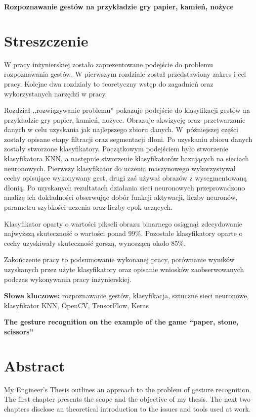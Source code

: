 \newpage
\begin{center}
\large \bf
Rozpoznawanie gestów na przykładzie gry papier, kamień, nożyce
\end{center}

\section*{Streszczenie}
W pracy inżynierskiej zostało zaprezentowane podejście do problemu rozpoznawania gestów. W pierwszym rozdziale został przedstawiony zakres i cel pracy. Kolejne dwa rozdziały to teoretyczny wstęp do zagadnień oraz wykorzystanych narzędzi w pracy. 

Rozdział ,,rozwiązywanie problemu'' pokazuje podejście do klasyfikacji gestów na przykładzie gry papier, kamień, nożyce. Obrazuje akwizycję oraz~przetwarzanie danych w celu uzyskania jak najlepszego zbioru danych. W~późniejszej części zostały opisane etapy filtracji oraz segmentacji dłoni. Po uzyskaniu zbioru danych zostały stworzone klasyfikatory. Początkowym podejściem było stworzenie klasyfikatora KNN, a następnie stworzenie klasyfikatorów bazujących na sieciach neuronowych. Pierwszy klasyfikator do uczenia maszynowego wykorzystywał cechy opisujące wykonywany gest, drugi zaś używał obrazów z wysegmentowaną dłonią. Po uzyskanych rezultatach działania sieci neuronowych przeprowadzono analizę ich dokładności obserwując dobór funkcji aktywacji, liczby neuronów, parametru szybkości uczenia oraz liczby epok uczących.

Klasyfikator oparty o wartości pikseli obrazu binarnego osiągnął zdecydowanie najwyższą skuteczność o wartości ponad 99\%. Pozostałe klasyfikatory oparte o cechy uzyskiwały skuteczność gorszą, wynoszącą około 85\%. 

Zakończenie pracy to podsumowanie wykonanej pracy, porównanie wyników uzyskanych przez użyte klasyfikatory oraz opisanie wniosków zaobserwowanych podczas wykonywania pracy inżynierskiej. 

\bigskip
{\noindent\bf Słowa kluczowe:} rozpoznawanie gestów, klasyfikacja, sztuczne sieci neuronowe, klasyfikator KNN, OpenCV, TensorFlow, Keras


\newpage
\begin{center}
\large \bf
The gesture recognition on the example of the game “paper, stone, scissors”
\end{center}

\section*{Abstract}
My Engineer's Thesis outlines an approach to the problem of gesture recognition. The first chapter presents the scope and the objective of my thesis. The next two chapters disclose an theoretical introduction to the issues and tools used at work. 

